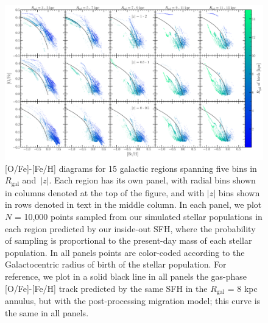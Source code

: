 \documentclass[fleqn, usenatbib]{mnras}
\begin{document}
\begin{figure} 
\centering 
\includegraphics[scale = 0.28]{ofe_feh_densitymap.pdf} 
\caption{[O/Fe]-[Fe/H] diagrams for 15 galactic regions spanning five bins in 
$R_\text{gal}$ and~$\left|z\right|$. Each region has its own panel, with radial 
bins shown in columns denoted at the top of the figure, and with 
$\left|z\right|$ bins shown in rows denoted in text in the middle column. In 
each panel, we plot $N$ = 10,000 points sampled from our simulated 
stellar populations in each region predicted by our inside-out SFH, where the 
probability of sampling is proportional to the present-day mass of each stellar 
population. In all panels points are color-coded according to the 
Galactocentric radius of birth of the stellar population. For reference, we 
plot in a solid black line in all panels the gas-phase [O/Fe]-[Fe/H] track 
predicted by the same SFH in the $R_\text{gal}$ = 8 kpc annulus, but with the 
post-processing migration model; this curve is the same in all panels. }
\label{fig:ofe_feh_diagram} 
\end{figure} 
\end{document}
